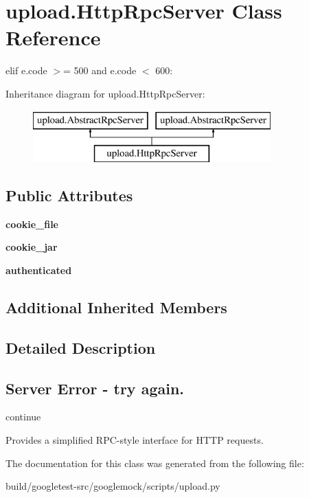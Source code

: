 \hypertarget{classupload_1_1HttpRpcServer}{}\section{upload.\+Http\+Rpc\+Server Class Reference}
\label{classupload_1_1HttpRpcServer}


elif e.\+code $>$= 500 and e.\+code $<$ 600\+:  


Inheritance diagram for upload.\+Http\+Rpc\+Server\+:\begin{figure}[H]
\begin{center}
\leavevmode
\includegraphics[height=2.000000cm]{classupload_1_1HttpRpcServer}
\end{center}
\end{figure}
\subsection*{Public Attributes}
\begin{DoxyCompactItemize}
\item 
\mbox{\label{classupload_1_1HttpRpcServer_ad5c1a730c030f9d3b5f70c2e0d8b9a1d}} 
{\bfseries cookie\+\_\+file}
\item 
\mbox{\label{classupload_1_1HttpRpcServer_a1b9c9af7f0a46afd84a9d524782323bf}} 
{\bfseries cookie\+\_\+jar}
\item 
\mbox{\label{classupload_1_1HttpRpcServer_aaa356e2491537dd0d4bfc5b1bb0fec96}} 
{\bfseries authenticated}
\end{DoxyCompactItemize}
\subsection*{Additional Inherited Members}


\subsection{Detailed Description}
\subsection*{Server Error -\/ try again.}

continue \begin{DoxyVerb}Provides a simplified RPC-style interface for HTTP requests.\end{DoxyVerb}
 

The documentation for this class was generated from the following file\+:\begin{DoxyCompactItemize}
\item 
build/googletest-\/src/googlemock/scripts/upload.\+py\end{DoxyCompactItemize}

